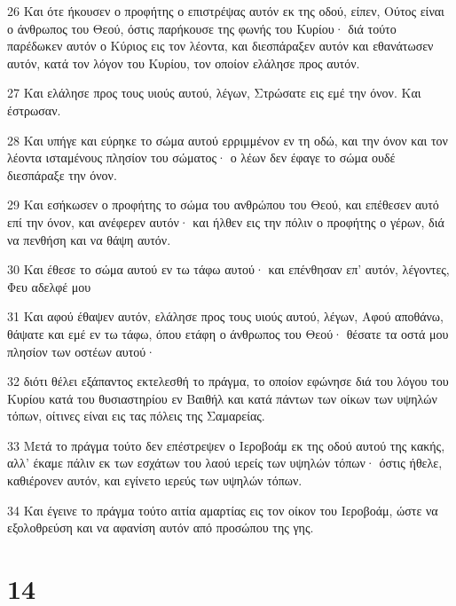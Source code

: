 \par 26 Και ότε ήκουσεν ο προφήτης ο επιστρέψας αυτόν εκ της οδού, είπεν, Ούτος είναι ο άνθρωπος του Θεού, όστις παρήκουσε της φωνής του Κυρίου· διά τούτο παρέδωκεν αυτόν ο Κύριος εις τον λέοντα, και διεσπάραξεν αυτόν και εθανάτωσεν αυτόν, κατά τον λόγον του Κυρίου, τον οποίον ελάλησε προς αυτόν.
\par 27 Και ελάλησε προς τους υιούς αυτού, λέγων, Στρώσατε εις εμέ την όνον. Και έστρωσαν.
\par 28 Και υπήγε και εύρηκε το σώμα αυτού ερριμμένον εν τη οδώ, και την όνον και τον λέοντα ισταμένους πλησίον του σώματος· ο λέων δεν έφαγε το σώμα ουδέ διεσπάραξε την όνον.
\par 29 Και εσήκωσεν ο προφήτης το σώμα του ανθρώπου του Θεού, και επέθεσεν αυτό επί την όνον, και ανέφερεν αυτόν· και ήλθεν εις την πόλιν ο προφήτης ο γέρων, διά να πενθήση και να θάψη αυτόν.
\par 30 Και έθεσε το σώμα αυτού εν τω τάφω αυτού· και επένθησαν επ' αυτόν, λέγοντες, Φευ αδελφέ μου
\par 31 Και αφού έθαψεν αυτόν, ελάλησε προς τους υιούς αυτού, λέγων, Αφού αποθάνω, θάψατε και εμέ εν τω τάφω, όπου ετάφη ο άνθρωπος του Θεού· θέσατε τα οστά μου πλησίον των οστέων αυτού·
\par 32 διότι θέλει εξάπαντος εκτελεσθή το πράγμα, το οποίον εφώνησε διά του λόγου του Κυρίου κατά του θυσιαστηρίου εν Βαιθήλ και κατά πάντων των οίκων των υψηλών τόπων, οίτινες είναι εις τας πόλεις της Σαμαρείας.
\par 33 Μετά το πράγμα τούτο δεν επέστρεψεν ο Ιεροβοάμ εκ της οδού αυτού της κακής, αλλ' έκαμε πάλιν εκ των εσχάτων του λαού ιερείς των υψηλών τόπων· όστις ήθελε, καθιέρονεν αυτόν, και εγίνετο ιερεύς των υψηλών τόπων.
\par 34 Και έγεινε το πράγμα τούτο αιτία αμαρτίας εις τον οίκον του Ιεροβοάμ, ώστε να εξολοθρεύση και να αφανίση αυτόν από προσώπου της γης.

\chapter{14}

